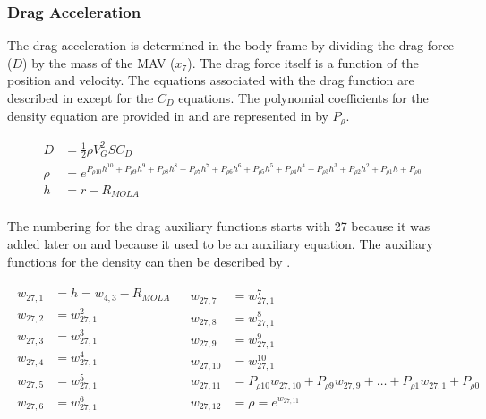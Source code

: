 \subsubsection{Drag Acceleration}
\label{subsubsec:tsiDrag}
The drag acceleration is determined in the body frame by dividing the drag force ($D$) by the mass of the \ac{MAV} ($x_{7}$). The drag force itself is a function of the position and velocity. The equations associated with the drag function are described in  except for the $C_{D}$ equations. The polynomial coefficients for the density equation are provided in  and are represented in  by $P_{\rho}$.

 \begin{equation} \label{eq:drag}
\begin{split}
D &= \frac{1}{2}\rho V_{G}^{2}SC_{D}\\
\rho &= e^{P_{\rho 10}h^{10}+P_{\rho 9}h^{9}+P_{\rho 8}h^{8}+P_{\rho 7}h^{7}+P_{\rho 6}h^{6}+P_{\rho 5}h^{5}+P_{\rho 4}h^{4}+P_{\rho 3}h^{3}+P_{\rho 2}h^{2}+P_{\rho 1}h+P_{\rho 0}} \\
h &= r-R_{MOLA} \\
\end{split}
\end{equation}

\noindent
The numbering for the drag auxiliary functions starts with 27 because it was added later on and because it used to be an auxiliary equation. The auxiliary functions for the density can then be described by .

\begin{align} \label{eq:dragAuxF}
\begin{split}
w_{27,1} &= h = w_{4,3} - R_{MOLA} \\
w_{27,2} &= w_{27,1}^{2}\\
w_{27,3} &= w_{27,1}^{3}\\
w_{27,4} &= w_{27,1}^{4}\\
w_{27,5} &= w_{27,1}^{5}\\
w_{27,6} &= w_{27,1}^{6}\\
\end{split}
&
\begin{split}
w_{27,7} &= w_{27,1}^{7}\\
w_{27,8} &= w_{27,1}^{8}\\
w_{27,9} &= w_{27,1}^{9}\\
w_{27,10} &= w_{27,1}^{10}\\
w_{27,11} &= P_{\rho 10}w_{27,10}+P_{\rho 9}w_{27,9}+\dotsc +P_{\rho 1}w_{27,1}+P_{\rho 0}\\
w_{27,12} &= \rho = e^{w_{27,11}} \\
\end{split}
\end{align}

